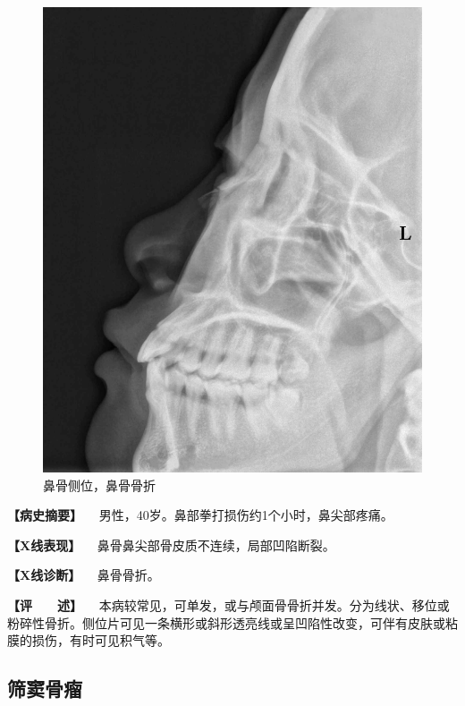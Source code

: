 \begin{figure}[!htbp]
 \centering
 \includegraphics{./images/Image00427.jpg}
 \captionsetup{justification=centering}
 \caption{鼻骨侧位，鼻骨骨折}
 \label{fig7-4-1}
  \end{figure} 

\textbf{【病史摘要】} 　男性，40岁。鼻部拳打损伤约1个小时，鼻尖部疼痛。

\textbf{【X线表现】} 　鼻骨鼻尖部骨皮质不连续，局部凹陷断裂。

\textbf{【X线诊断】} 　鼻骨骨折。

\textbf{【评　　述】}
　本病较常见，可单发，或与颅面骨骨折并发。分为线状、移位或粉碎性骨折。侧位片可见一条横形或斜形透亮线或呈凹陷性改变，可伴有皮肤或粘膜的损伤，有时可见积气等。

\subsection{筛窦骨瘤}

